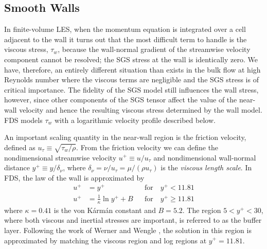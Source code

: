 \subsection{Smooth Walls}
\label{smooth_wall_model}

In finite-volume LES, when the momentum equation is integrated over a cell adjacent to the wall it turns out that the most difficult term to handle is the viscous stress, $\tau_w$, because the wall-normal gradient of the streamwise velocity component cannot be resolved; the SGS stress at the wall is identically zero.  We have, therefore, an entirely different situation than exists in the bulk flow at high Reynolds number where the viscous terms are negligible and the SGS stress is of critical importance.  The fidelity of the SGS model still influences the wall stress, however, since other components of the SGS tensor affect the value of the near-wall velocity and hence the resulting viscous stress determined by the wall model. FDS models $\tau_w$ with a logarithmic velocity profile \cite{Pope:2000} described below.

An important scaling quantity in the near-wall region is the friction velocity, defined as $u_\tau \equiv \sqrt{\tau_w/\rho}$.
From the friction velocity we can define the nondimensional streamwise velocity $u^+ \equiv u/u_\tau$ and nondimensional wall-normal distance $y^+ \equiv y/\delta_\nu$, where $\delta_\nu = \nu/u_\tau = \mu/(\rho u_\tau)$ is the \emph{viscous length scale}. In FDS, the law of the wall is approximated by
\begin{align}
\label{eqn_visclayer} u^+ &= y^+                           && \mbox{for} \quad y^+ < 11.81 \\
\label{eqn_loglaw}    u^+ &= \frac{1}{\kappa} \ln y^+ + B  && \mbox{for} \quad y^+ \ge 11.81
\end{align}
where $\kappa = 0.41$ is the von K\'arm\'an constant and $B=5.2$.  The region $5 < y^+ < 30$, where both viscous and inertial stresses are important, is referred to as the buffer layer.  Following the work of Werner and Wengle \cite{Werner:1991}, the solution in this region is approximated by matching the viscous region and log regions at $y^+ = 11.81$.



